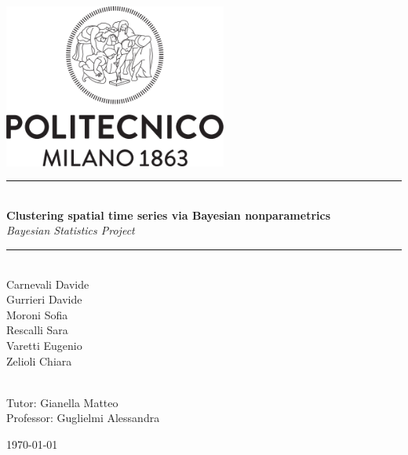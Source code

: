 \documentclass[12pt,a4paper]{article}
\newcommand{\HRule}{\rule{\linewidth}{0.5mm}}
\begin{document}
\begin{titlepage}
\begin{center}

\includegraphics[width=0.55\textwidth]{Logo_Politecnico_Milano.png}~\\[2cm]


\HRule \\[0.4cm]
{ \LARGE 
  \textbf{Clustering spatial time series via Bayesian
nonparametrics}\\[0.4cm]
  \emph{Bayesian Statistics Project}\\[0.4cm]
}
\HRule \\[1.5cm]



{ \large
  Carnevali Davide \\
  Gurrieri Davide\\
  Moroni Sofia\\
  Rescalli Sara\\
  Varetti Eugenio\\
  Zelioli Chiara\\
}

\\[1.5cm]

{ \large
Tutor: Gianella Matteo \\
Professor: Guglielmi Alessandra
}

\vfill


{\large \today}
 
\end{center}
\end{titlepage}







\tableofcontents
{}
\newpage
\setcounter{page}{1}


\end{document}
